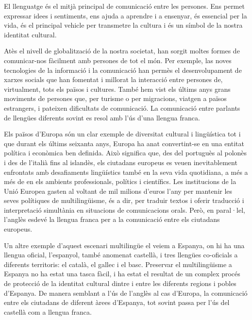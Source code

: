 \begin{multicols}{2}
El llenguatge és el mitjà principal de comunicació entre les persones. Ens permet expressar idees i sentiments, ens ajuda a aprendre i a ensenyar, és essencial per la vida, és el principal vehicle per transmetre la cultura i és un símbol de la nostra identitat cultural. 


Atès el nivell de globalització de la nostra societat, han sorgit moltes formes de comunicar-nos fàcilment amb persones de tot el món. Per exemple, las noves tecnologies de la informació i la comunicació han permès el desenvolupament de xarxes socials que han fomentat i millorat la interacció entre persones de, virtualment, tots els països i cultures. També hem vist els últims anys grans moviments de persones que, per turisme o per migracions, viatgen a països estrangers, i pateixen dificultats de comunicació. La comunicació entre parlants de llengües diferents sovint es resol amb l’ús d’una llengua franca. 

Els països d’Europa són un clar exemple de diversitat cultural i lingüística tot i que durant els últims seixanta anys, Europa ha anat convertint-se en una entitat política i econòmica ben definida. Això significa que, des del portuguès al polonès i des de l’italià fins al islandès, els ciutadans europeus es veuen inevitablement enfrontats amb desafiaments lingüístics també en la seva vida quotidiana, a més a més de en els ambients professionals, polítics i científics. Les institucions de la Unió Europea gasten al voltant de mil milions d’euros l’any per mantenir les seves polítiques de multilingüisme, és a dir, per traduir textos i oferir traducció i interpretació simultània en situacions de comunicacions orals. Però, en paral·lel, l’anglès esdevé la llengua franca per a la comunicació entre els ciutadans europeus.  

Un altre exemple d’aquest escenari multilingüe el veiem a Espanya, on hi ha una llengua oficial, l’espanyol, també anomenat castellà, i tres llengües co-oficials a diferents territoris: el català, el gallec i el basc. Preservar el multilingüisme a Espanya no ha estat una tasca fàcil, i ha estat el resultat de un complex procés de protecció de la identitat cultural dintre i entre les diferents regions i pobles d’Espanya. De manera semblant a l’ús de l’anglès al cas d’Europa, la comunicació entre els ciutadans de diferent àrees d’Espanya, tot sovint passa per l’ús del castellà com a llengua franca. 


\end{multicols}
